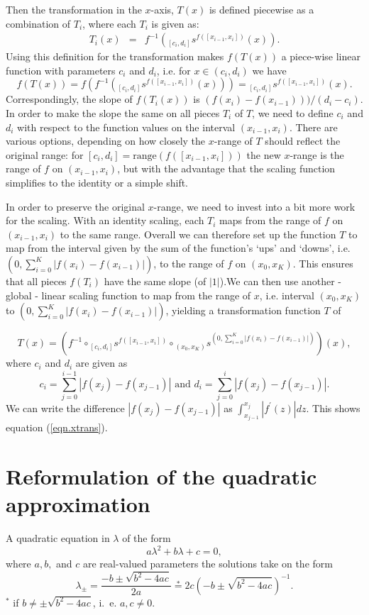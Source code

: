 \documentclass[12pt]{article}\usepackage[]{graphicx}\usepackage[]{color}
\newcommand{\range}[1]{{\text{range}\left(#1\right)}}
\newcommand{\s}[2]{{_{#1}s^{ #2}}}
\begin{document}
\begin{appendix}
Then the transformation in the $x$-axis, $T(x)$ is defined piecewise as a combination of $T_i$, where each $T_i$ is given as:
\begin{eqnarray}\label{eq.x.transformation}
T_i(x) &=& f^{-1}\left( \s{[c_i,d_i]}{f([x_{i-1}, x_i])}(x) \right). 
\end{eqnarray}
%
Using this definition for the transformation makes $f(T(x))$ a piece-wise linear function with parameters $c_i$ and $d_i$, i.e. for $x \in (c_i,d_i)$ we have
\[
f(T(x)) = f (f^{-1}(\s{[c_i,d_i]}{f([x_{i-1}, x_i])}(x))) = \s{[c_i,d_i]}{f([x_{i-1}, x_i])}(x).
\]
Correspondingly, the slope of $f(T_i(x))$ is $(f(x_{i}) - f(x_{i-1})))/(d_i-c_i)$.
In order to make the slope the same on all pieces $T_i$ of $T$, we need to define $c_i$ and $d_i$ with respect to the function values on the interval $(x_{i-1}, x_i)$. There are various options, depending on how closely the $x$-range of $T$ should reflect the original range:
for $[c_i, d_i] = \range {f([x_{i-1}, x_i])}$ the new $x$-range is the range of $f$ on $(x_{i-1}, x_i)$, but with the advantage that the scaling function simplifies to the identity or a simple shift.

In order to preserve the original $x$-range, we need to invest into a bit more work for the scaling. With an identity scaling, each $T_i$ maps from the range of $f$ on $(x_{i-1}, x_i)$ to the same range. Overall we can therefore set up the function $T$ to map from the interval given by the sum of the function's `ups' and `downs', i.e.
$(0, \sum_{i=0}^K |f(x_i) - f(x_{i-1})|)$, to the range of $f$ on $(x_0, x_K)$.  This ensures that all pieces $f(T_i)$ have the same slope (of $|1|$).We can then use another - global - linear scaling function to map from the range of $x$, i.e. interval $(x_0, x_K)$ to $(0, \sum_{i=0}^K |f(x_i) - f(x_{i-1})|)$, yielding a transformation function $T$ of

\[
T (x) =  (f^{-1} \circ \s{[c_i,d_i]}{f([x_{i-1}, x_i])} \circ \s{(x_0, x_K)}{(0, \sum_{i=0}^K |f(x_i) - f(x_{i-1})|)}) (x),  
\]
where $c_i$ and $d_i$ are given as 
\[
c_i = \sum_{j=0}^{i-1} |f(x_j) - f(x_{j-1})| \text{ and } d_i = \sum_{j=0}^{i} |f(x_j) - f(x_{j-1})|.
\]
We can write the difference $|f(x_j) - f(x_{j-1})|$ as $\int_{x_{j-1}}^{x_j} |f^\prime(z)|dz$. This shows equation (\ref{eqn.xtrans}).


\section{Reformulation of the quadratic approximation}\label{app.quadratic}
A quadratic equation in $\lambda$ of the form 
\begin{equation}\label{quadratic.equation}
a\lambda^2 + b\lambda + c = 0,
\end{equation}
where $a, b,$ and $c$ are real-valued parameters the solutions take on the form
\[
\lambda_{\pm} = \frac{-b \pm \sqrt{b^2 - 4ac}}{2a}  \stackrel{*}{=} 2c\left(-b \pm \sqrt{b^2 - 4ac}\right)^{-1}.
\]
$^*$ if $b \neq \pm \sqrt{b^2 - 4ac}$, i.~e. $a, c \neq 0$.

\end{appendix}
\end{document}
